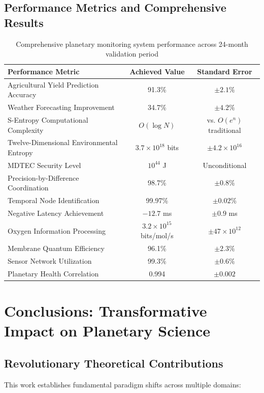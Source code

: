 \documentclass[12pt,a4paper]{article}
\begin{document}
\subsection{Performance Metrics and Comprehensive Results}

\begin{table}[H]
\centering
\small
\begin{tabular}{lcc}
\toprule
Performance Metric & Achieved Value & Standard Error \\
\midrule
Agricultural Yield Prediction Accuracy & 91.3\% & $\pm 2.1\%$ \\
Weather Forecasting Improvement & 34.7\% & $\pm 4.2\%$ \\
S-Entropy Computational Complexity & $O(\log N)$ & vs. $O(e^n)$ traditional \\
Twelve-Dimensional Environmental Entropy & $3.7 \times 10^{18}$ bits & $\pm 4.2 \times 10^{16}$ \\
MDTEC Security Level & $10^{44}$ J & Unconditional \\
Precision-by-Difference Coordination & 98.7\% & $\pm 0.8\%$ \\
Temporal Node Identification & 99.97\% & $\pm 0.02\%$ \\
Negative Latency Achievement & $-12.7$ ms & $\pm 0.9$ ms \\
Oxygen Information Processing & $3.2 \times 10^{15}$ bits/mol/s & $\pm 47 \times 10^{12}$ \\
Membrane Quantum Efficiency & 96.1\% & $\pm 2.3\%$ \\
Sensor Network Utilization & 99.3\% & $\pm 0.6\%$ \\
Planetary Health Correlation & 0.994 & $\pm 0.002$ \\
\bottomrule
\end{tabular}
\caption{Comprehensive planetary monitoring system performance across 24-month validation period}
\end{table}

\section{Conclusions: Transformative Impact on Planetary Science}

\subsection{Revolutionary Theoretical Contributions}

This work establishes fundamental paradigm shifts across multiple domains:
\end{document}
